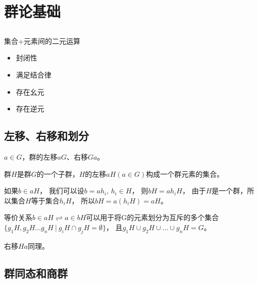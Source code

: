 \section{群论基础}

\subsection{}

\noindent 集合+元素间的二元运算
\begin{itemize}
    \item 封闭性
    \item 满足结合律
    \item 存在幺元
    \item 存在逆元
\end{itemize}

\subsection{左移、右移和划分}

$a\in G$，群的左移$aG$、右移$Ga$。

群$H$是群$G$的一个子群，$H$的左移$aH(a\in G)$构成一个群元素的集合。

如果$b\in aH$，
我们可以设$b= ah_{i},\,h_{i}\in H$，
则$bH=ah_{i}H$，
由于$H$是一个群，所以集合$H$等于集合$h_{i}H$，
所以$bH=a(h_{i}H)=aH$。

等价关系$b\in aH\rightleftharpoons a\in bH$可以用于将G的元素划分为互斥的多个集合
$\{g_{1}H,g_{2}H...g_{n}H\ |\ g_{i}H\cap g_{j}H=\emptyset\}$，
且$g_{1}H\cup g_{2}H\cup ...\cup g_{n}H=G$。

右移$Ha$同理。


\subsection{群同态和商群}

